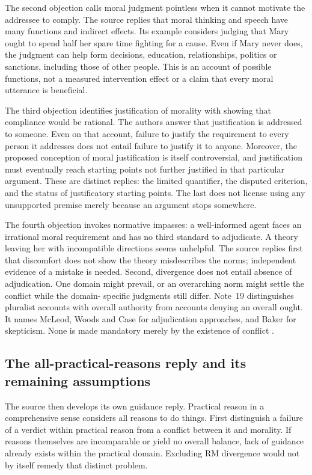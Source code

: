 The second objection calls moral judgment pointless when it cannot
motivate the addressee to comply. The source replies that moral
thinking and speech have many functions and indirect effects.
Its example considers judging that Mary ought to spend half her
spare time fighting for a cause. Even if Mary never does, the
judgment can help form decisions, education, relationships,
politics or sanctions, including those of other people. This is
an account of possible functions, not a measured intervention
effect or a claim that every moral utterance is beneficial.

The third objection identifies justification of morality with
showing that compliance would be rational. The authors answer
that justification is addressed to someone. Even on that account,
failure to justify the requirement to every person it addresses
does not entail failure to justify it to anyone. Moreover, the
proposed conception of moral justification is itself controversial,
and justification must eventually reach starting points not further
justified in that particular argument. These are distinct replies:
the limited quantifier, the disputed criterion, and the status
of justificatory starting points. The last does not license using
any unsupported premise merely because an argument stops somewhere.

The fourth objection invokes normative impasses: a well-informed
agent faces an irrational moral requirement and has no third
standard to adjudicate. A theory leaving her with incompatible
directions seems unhelpful. The source replies first that discomfort
does not show the theory misdescribes the norms; independent
evidence of a mistake is needed. Second, divergence does not
entail absence of adjudication. One domain might prevail, or
an overarching norm might settle the conflict while the domain-
specific judgments still differ. Note~19 distinguishes pluralist
accounts with overall authority from accounts denying an overall
ought. It names McLeod, Woods and Case for adjudication approaches,
and Baker for skepticism. None is made mandatory merely by the
existence of conflict \parencite[pp.~688--690 and n.~19]{FehigeWessels2021Morality}.

\subsection{The all-practical-reasons reply and its remaining assumptions}

The source then develops its own guidance reply. Practical reason
in a comprehensive sense considers all reasons to do things.
First distinguish a failure of a verdict within practical reason
from a conflict between it and morality. If reasons themselves
are incomparable or yield no overall balance, lack of guidance
already exists within the practical domain. Excluding RM divergence
would not by itself remedy that distinct problem.

